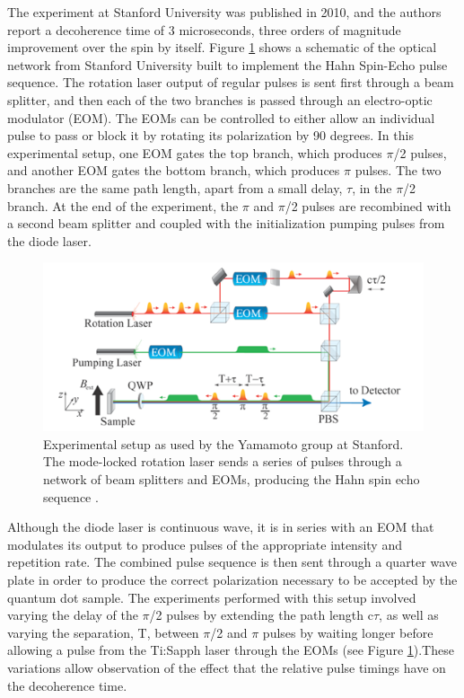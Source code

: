 \documentclass[pdftex,12pt,a4paper]{article}
\begin{document}
The experiment at Stanford University was published in 2010, and the authors report a decoherence time of 3 microseconds, three orders of magnitude improvement over the spin by itself. Figure \ref{fig:Stanford} shows a schematic of the optical network from Stanford University built to implement the Hahn Spin-Echo pulse sequence. The rotation laser output of regular pulses is sent first through a beam splitter, and then each of the two branches is passed through an electro-optic modulator (EOM). The EOMs can be controlled to either allow an individual pulse to pass or block it by rotating its polarization by 90 degrees. In this experimental setup, one EOM gates the top branch, which produces $\pi$/2 pulses, and another EOM gates the bottom branch, which produces $\pi$ pulses. The two branches are the same path length, apart from a small delay, $\tau$, in the $\pi$/2 branch. At the end of the experiment, the $\pi$ and $\pi$/2 pulses are recombined with a second beam splitter and coupled with the initialization pumping pulses from the diode laser\cite{de_greve_ultrafast_2011}.

\begin{figure}[H]
  \centering
    \includegraphics[scale=.75]{StanfordSetup}
  \caption{Experimental setup as used by the Yamamoto group at Stanford. The mode-locked rotation laser sends a series of pulses through a network of beam splitters and EOMs, producing the Hahn spin echo sequence \cite{de_greve_ultrafast_2011}.}
  \label{fig:Stanford}
\end{figure}

Although the diode laser is continuous wave, it is in series with an EOM that modulates its output to produce pulses of the appropriate intensity and repetition rate. The combined pulse sequence is then sent through a quarter wave plate in order to produce the correct polarization necessary to be accepted by the quantum dot sample. The experiments performed with this setup involved varying the delay of the $\pi$/2 pulses by extending the path length c$\tau$, as well as varying the separation, T, between $\pi$/2 and $\pi$ pulses by waiting longer before allowing a pulse from the Ti:Sapph laser through the EOMs (see Figure \ref{fig:Stanford}).These variations allow observation of the effect that the relative pulse timings have on the decoherence time\cite{de_greve_ultrafast_2011}.
\end{document}
